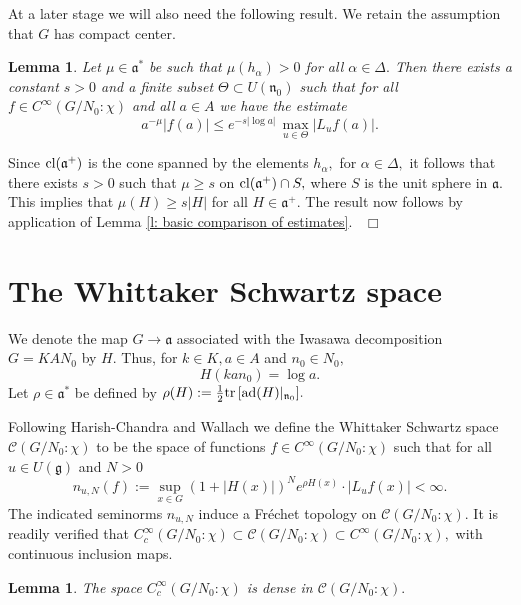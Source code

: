 \documentclass[12pt,a4paper]{article}
\newtheorem{Lemma}[Thm]{Lemma}
\newenvironment{lemma}[0]{\begin{Lemma}\noindent}%
{\end{Lemma}}
\def\proof{\par\noindent{\it Proof.}{\ }{\ }}
\def\qed{~\hfill\hbox{$\Box$}\medbreak}
\def\ga{\alpha}
\def\gD{\Delta}
\def\got#1{\mathfrak #1}
\def\fa{{\got a}}
\def\fg{{\got g}}
\def\fn{{\got n}}
\def\to{\rightarrow}
\def\ad{{\rm ad}}
\def\tr{{\rm tr}\,}
\def\cC{{\mathcal C}}
\numberwithin{Thm}{section}
\numberwithin{equation}{section}
\numberwithin{equation}{section}
\def\fad{{\fa^*}}
\def\cl{{\rm cl}}
\def\col{\!:\!}
\def\cchi{\chi}
\begin{document}
At a later stage we will also need the following result. We retain the assumption 
that $G$ has compact center.

\begin{lemma}
\label{l: moderate estimate with negative exp}
Let $\mu \in \fad$ be 
such that $\mu(h_\ga)  > 0$ for all $\ga \in \gD.$ Then there exists
a constant $s > 0$ and a finite subset $\Theta \subset U(\fn_0)$ such that
for all $f \in C^\infty(G/N_0\col \cchi)$ and all $a \in A$ we have the estimate
\begin{equation}
\label{e: estimate f from exponent on aplus}
a^{-\mu}  | f(a)| \leq  e^{-s|\log a|} \,\max_{u\in \Theta}  |L_u f(a)|.
\end{equation}
\end{lemma}

\proof Since $\cl(\fa^+)$ is the cone spanned by the elements $h_\ga,$ for $\ga \in
\gD,$ it follows that there exists $s > 0$ such that 
$\mu \geq s$ on $\cl(\fa^+) \cap S,$ where $S$ is the unit sphere
in $\fa.$ This implies that $\mu(H) \geq s|H|$ for all $H \in \fa^+.$ 
The result now follows by application of Lemma \ref{l: basic comparison of estimates}.
\qed

\section{The Whittaker Schwartz space}\label{s: W S space}
We denote the map $G \to \fa$ associated with the Iwasawa decomposition 
$G= K A N_0$ by $H.$ Thus, for $k\in K, a\in A$ and $n_0 \in N_0,$
\begin{equation}
\label{e: Iwasawa H}
H(ka n_0) = \log a.
\end{equation}
Let $\rho \in \fa^*$ be defined by $\rho(H) := \frac12 \tr [\ad(H)|_{\fn_0}].$ 

Following Harish-Chandra \cite[\S 1.3]{HCwhit} and Wallach \cite[\S 15.3.1]{Wrrg2}
we define the Whittaker Schwartz space 
$\cC(G/N_0\col \cchi)$ to be the space of functions $f \in C^\infty(G/N_0\col \cchi)$ 
such that for all $u \in U(\fg)$ and $N > 0$
$$ 
n_{u,N}(f):= \sup_{x \in G} (1 + |H(x)|)^N e^{\rho H(x)}\cdot  | L_u f(x)| < \infty.
$$%
The indicated seminorms $n_{u,N}$ induce a Fr\'echet topology on $\cC(G/N_0\col \cchi).$ 
It is readily verified that
$
C^\infty_c (G/N_0\col \cchi)\subset \cC(G/N_0\col \cchi) \subset C^\infty(G/N_0\col \cchi),
$
with continuous inclusion maps.

\begin{lemma}
The space $C_c^\infty(G/N_0\col \cchi)$ is dense in $\cC(G/N_0\col \cchi).$ 
\end{lemma}
\end{document}
